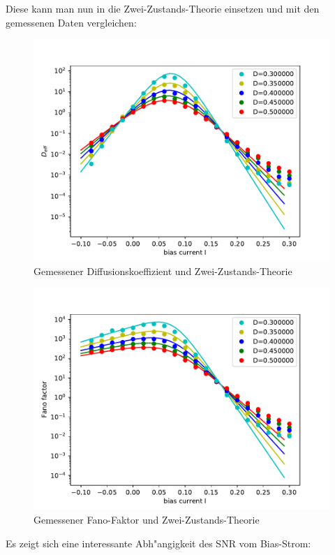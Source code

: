 \documentclass[12pt,a4paper]{article}
\begin{document}
Diese kann man nun in die Zwei-Zustands-Theorie einsetzen und mit den gemessenen Daten vergleichen:
\begin{figure}[H]
	\centering
	\includegraphics[scale=0.9]{dcompdfrealfast11jjem2shrealfast19jjem2st.pdf}
	\caption{Gemessener Diffusionskoeffizient und Zwei-Zustands-Theorie}
	\label{deff2st}
\end{figure}
\begin{figure}[H]
	\centering
	\includegraphics[scale=0.9]{fcompdfrealfast11jjem2shrealfast19jjem2st.pdf}
	\caption{Gemessener Fano-Faktor und Zwei-Zustands-Theorie}
	\label{fano2st}
\end{figure}
Es zeigt sich eine interessante Abh"angigkeit des SNR vom Bias-Strom:
\end{document}
